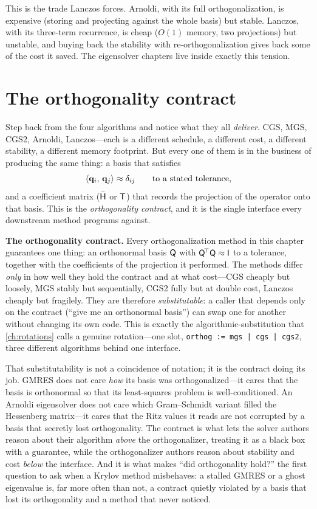 This is the trade Lanczos forces. Arnoldi, with its full orthogonalization, is
expensive (storing and projecting against the whole basis) but stable. Lanczos, with
its three-term recurrence, is cheap ($O(1)$ memory, two projections) but unstable, and
buying back the stability with re-orthogonalization gives back some of the cost it
saved. The eigensolver chapters live inside exactly this tension.

\section{The orthogonality contract}
\label{sec:contract}

Step back from the four algorithms and notice what they all \emph{deliver}. CGS, MGS,
CGS2, Arnoldi, Lanczos---each is a different schedule, a different cost, a different
stability, a different memory footprint. But every one of them is in the business of
producing the same thing: a basis that satisfies
\[
  \left\langle \mathbf{q}_i,\, \mathbf{q}_j\right\rangle \approx \delta_{ij}
  \qquad\text{to a stated tolerance,}
\]
and a coefficient matrix ($\bar{\mathsf{H}}$ or $\mathsf{T}$) that records the projection of
the operator onto that basis. This is the \emph{orthogonality contract}, and it is the
single interface every downstream method programs against.

\begin{keyidea}
\textbf{The orthogonality contract.} Every orthogonalization method in this chapter
guarantees one thing: an orthonormal basis $\mathsf{Q}$ with
$\mathsf{Q}^{\!\top}\mathsf{Q} \approx \mathsf{I}$ to a tolerance, together with the
coefficients of the projection it performed. The methods differ \emph{only} in how
well they hold the contract and at what cost---CGS cheaply but loosely, MGS stably but
sequentially, CGS2 fully but at double cost, Lanczos cheaply but fragilely. They are
therefore \emph{substitutable}: a caller that depends only on the contract (``give me
an orthonormal basis'') can swap one for another without changing its own code. This
is exactly the algorithmic-substitution that \cref{ch:rotations} calls a genuine
rotation---one slot, \lstinline[style=l4style]@orthog := mgs | cgs | cgs2@, three
different algorithms behind one interface.
\end{keyidea}

That substitutability is not a coincidence of notation; it is the contract doing its
job. GMRES does not care \emph{how} its basis was orthogonalized---it cares that the
basis is orthonormal so that its least-squares problem is well-conditioned. An Arnoldi
eigensolver does not care which Gram--Schmidt variant filled the Hessenberg
matrix---it cares that the Ritz values it reads are not corrupted by a basis that
secretly lost orthogonality. The contract is what lets the solver authors reason about
their algorithm \emph{above} the orthogonalizer, treating it as a black box with a
guarantee, while the orthogonalizer authors reason about stability and cost
\emph{below} the interface. And it is what makes ``did orthogonality hold?'' the first
question to ask when a Krylov method misbehaves: a stalled GMRES or a ghost eigenvalue
is, far more often than not, a contract quietly violated by a basis that lost its
orthogonality and a method that never noticed.

